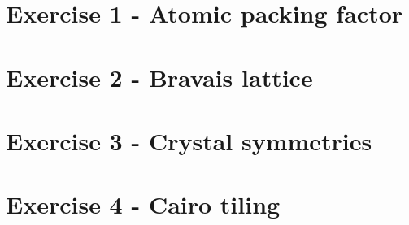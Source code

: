 








\section{Exercise 1 - Atomic packing factor}


\section{Exercise 2 - Bravais lattice}


\section{Exercise 3 - Crystal symmetries}


\section{Exercise 4 - Cairo tiling}


